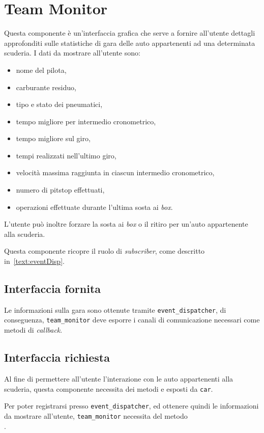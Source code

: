 \section{Team Monitor}
Questa componente è un'interfaccia grafica che serve a fornire all'utente dettagli approfonditi sulle statistiche di gara delle auto appartenenti ad una determinata scuderia.
I dati da mostrare all'utente sono:
\begin{itemize}
\item nome del pilota,
\item carburante residuo,
\item tipo e stato dei pneumatici,
\item tempo migliore per intermedio cronometrico,
\item tempo migliore sul giro,
\item tempi realizzati nell'ultimo giro,
\item velocità massima raggiunta in ciascun intermedio cronometrico,
\item numero di pitstop effettuati,
\item operazioni effettuate durante l'ultima sosta ai \textit{box}.
\end{itemize}
L'utente può inoltre forzare la sosta ai \textit{box} o il ritiro per un'auto appartenente alla scuderia.

Questa componente ricopre il ruolo di \textit{subscriber}, come descritto in~\ref{text:eventDisp}.

\subsection*{Interfaccia fornita}
Le informazioni sulla gara sono ottenute tramite \texttt{event\_dispatcher}, di conseguenza, \texttt{team\_monitor} deve esporre i canali di comunicazione necessari come metodi di \textit{callback}.
\subsection*{Interfaccia richiesta}
Al fine di permettere all'utente l'interazione con le auto appartenenti alla scuderia, questa componente necessita dei metodi  e  esposti da \texttt{car}.

Per poter registrarsi presso \texttt{event\_dispatcher}, ed ottenere quindi le informazioni da mostrare all'utente, \texttt{team\_monitor} necessita del metodo \\.


